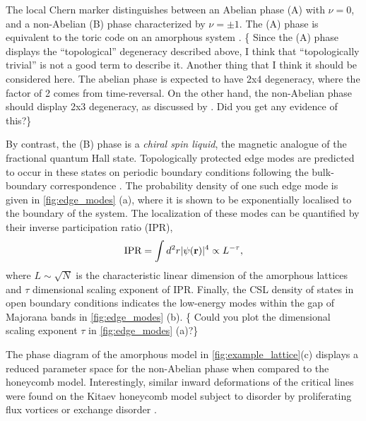 The local Chern marker distinguishes between an Abelian phase (A) with
\(\nu = 0\), and a non-Abelian (B) phase characterized by
\(\nu = \pm 1\). The (A) phase is equivalent to the toric code on an
amorphous system \cite{kitaev_fault-tolerant_2003}. \{\color{red} Since
the (A) phase displays the ``topological'' degeneracy described above, I
think that ``topologically trivial'' is not a good term to describe it.
Another thing that I think it should be considered here. The abelian
phase is expected to have 2x4 degeneracy, where the factor of 2 comes
from time-reversal. On the other hand, the non-Abelian phase should
display 2x3 degeneracy, as discussed by \cite{yaoExactChiralSpin2007}.
Did you get any evidence of this?\}

\par

By contrast, the (B) phase is a \emph{chiral spin liquid}, the magnetic
analogue of the fractional quantum Hall state. Topologically protected
edge modes are predicted to occur in these states on periodic boundary
conditions following the bulk-boundary correspondence
\cite{qi_general_2006}. The probability density of one such edge mode is
given in \cref{fig:edge_modes} (a), where it is shown to be
exponentially localised to the boundary of the system. The localization
of these modes can be quantified by their inverse participation ratio
(IPR), \begin{equation}
    \textup{IPR} = \int d^2r|\psi(\mathbf{r})|^4  \propto L^{-\tau},
\end{equation} where \(L\sim\sqrt{N}\) is the characteristic linear
dimension of the amorphous lattices and \(\tau\) dimensional scaling
exponent of IPR. Finally, the CSL density of states in open boundary
conditions indicates the low-energy modes within the gap of Majorana
bands in \cref{fig:edge_modes} (b). \{\color{red} Could you plot the
dimensional scaling exponent \(\tau\) in \cref{fig:edge_modes} (a)?\}

\par

The phase diagram of the amorphous model in \ref{fig:example_lattice}(c)
displays a reduced parameter space for the non-Abelian phase when
compared to the honeycomb model. Interestingly, similar inward
deformations of the critical lines were found on the Kitaev honeycomb
model subject to disorder by proliferating flux vortices
\cite{Nasu_Thermal_2015} or exchange disorder
\cite{knolle_dynamics_2016}.

